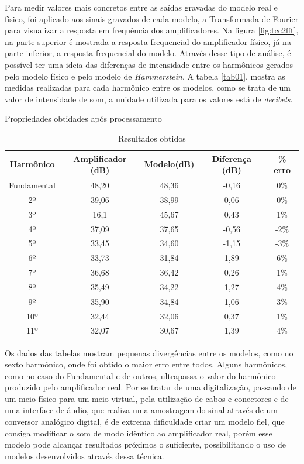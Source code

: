 Para medir valores mais concretos entre as saídas gravadas do modelo real e físico, foi aplicado aos sinais gravados de cada modelo, a Transformada de Fourier para visualizar a resposta em frequência dos amplificadores. Na figura \ref{fig:tcc2fft}, na parte superior é mostrada a resposta frequencial do amplificador físico, já na parte inferior, a resposta frequencial do modelo. Através desse tipo de análise, é possível ter uma ideia das diferenças de intensidade entre os harmônicos gerados pelo modelo físico e pelo modelo de \textit{Hammerstein}. A tabela \ref{tab01}, mostra as medidas realizadas para cada harmônico entre os modelos, como se trata de um valor de intensidade de som, a unidade utilizada para os valores está de \textit{decibels}.
\begin{table}[h]
	\centering
	\caption{Propriedades obtidades após processamento}
	\label{tab01}
	
	\begin{tabular}{ccccc}
		\toprule
		\textbf{Harmônico} & \textbf{Amplificador (dB)} & \textbf{Modelo(dB)} & \textbf{Diferença (dB)} & \textbf{\% erro}  \\
		\midrule
		Fundamental & 48,20 & 48,36 & -0,16 & 0\% \\
		2º & 39,06 & 38,99 & 0,06 & 0\%  \\
		3º & 16,1 & 45,67 & 0,43 & 1\% 	\\
		4º & 37,09 & 37,65 & -0,56 & -2\% \\
		5º & 33,45 & 34,60 & -1,15 & -3\% \\ 
		6º & 33,73 & 31,84 & 1,89 & 6\%   \\ 
		7º & 36,68 & 36,42 & 0,26 & 1\%   \\ 
		8º & 35,49 & 34,22 & 1,27 & 4\%   \\ 
		9º & 35,90 & 34,84 & 1,06 & 3\%   \\ 
		10º & 32,44 & 32,06 & 0,37 & 1\%  \\ 
		11º & 32,07 & 30,67 & 1,39 & 4\%  \\
		\bottomrule
	\end{tabular}
	\label{Resultados obtidos}
	\caption{Resultados obtidos}
\end{table}

Os dados das tabelas mostram pequenas divergências entre os modelos, como no sexto harmônico, onde foi obtido o maior erro entre todos. Alguns harmônicos, como no caso do Fundamental e de outros, ultrapassa o valor do harmônico produzido pelo amplificador real. Por se tratar de uma digitalização, passando de um meio físico para um meio virtual, pela utilização de cabos e conectores e de uma interface de áudio, que realiza uma amostragem do sinal através de um conversor analógico digital, é de extrema dificuldade criar um modelo fiel, que consiga modificar o som de modo idêntico ao amplificador real, porém esse modelo pode alcançar resultados próximos o suficiente, possibilitando o uso de modelos desenvolvidos através dessa técnica.



